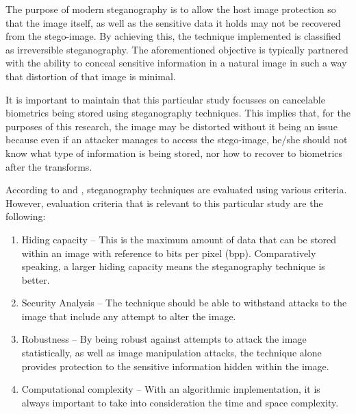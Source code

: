 The purpose of modern steganography is to allow the host image protection so that the image itself, as well as the sensitive data it holds may not be recovered from the stego-image. By achieving this, the technique implemented is classified as irreversible steganography. The aforementioned objective is typically partnered with the ability to conceal sensitive information in a natural image in such a way that distortion of that image is minimal.

It is important to maintain that this particular study focusses on cancelable biometrics being stored using steganography techniques. This implies that, for the purposes of this research, the image may be distorted without it being an issue because even if an attacker manages to access the stego-image, he/she should not know what type of information is being stored, nor how to recover to biometrics after the transforms. 

According to \cite{Jain2016} and \cite{Pradhan2016}, steganography techniques are evaluated using various criteria. However, evaluation criteria that is relevant to this particular study are the following:

\begin{enumerate}[label=\roman*.]
	
	\item Hiding capacity – This is the maximum amount of data that can be stored within an image with reference to bits per pixel (bpp). Comparatively speaking, a larger hiding capacity means the steganography technique is better.
	
	\item Security Analysis – The technique should be able to withstand attacks to the image that include any attempt to alter the image.
	
	\item Robustness – By being robust against attempts to attack the image statistically, as well as image manipulation attacks, the technique alone provides protection to the sensitive information hidden within the image. 
	
	\item Computational complexity – With an algorithmic implementation, it is always important to take into consideration the time and space complexity.

\end{enumerate}
	
